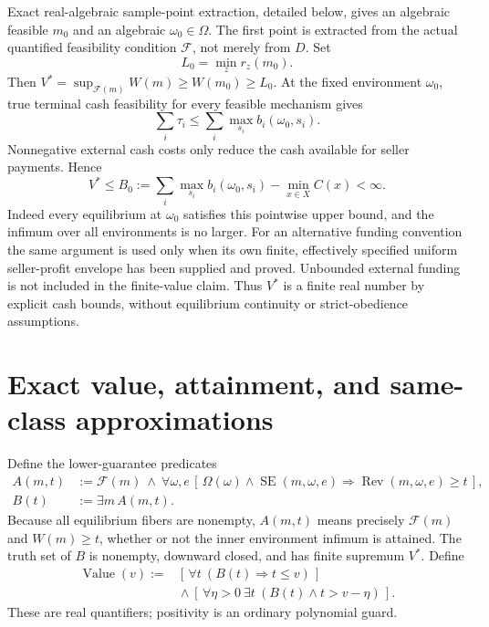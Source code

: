 \documentclass[11pt,a4paper]{article}
\numberwithin{equation}{section}
\theoremstyle{definition}
\DeclareMathOperator{\SE}{SE}
\DeclareMathOperator{\Val}{Value}
\DeclareMathOperator{\Rev}{Rev}
\begin{document}
Exact real-algebraic sample-point extraction, detailed below, gives
an algebraic feasible \(m_0\) and an algebraic \(\omega_0\in\Omega\).
The first point is extracted from the actual quantified feasibility
condition \(\mathcal F\), not merely from \(D\).
Set
\[
 L_0=\min_z r_z(m_0).
\]
Then \(V^*=\sup_{\mathcal F(m)}W(m)\ge W(m_0)\ge L_0\).
At the fixed environment \(\omega_0\), true terminal cash feasibility
for every feasible mechanism gives
\[
 \sum_i\tau_i\le\sum_i\max_{s_i}b_i(\omega_0,s_i).
\]
Nonnegative external cash costs only reduce the cash available for
seller payments. Hence
\begin{equation}\label{eq:valuebound}
 V^*\le B_0:=
    \sum_i\max_{s_i}b_i(\omega_0,s_i)-\min_{x\in X}C(x)<\infty.
\end{equation}
Indeed every equilibrium at \(\omega_0\) satisfies this pointwise
upper bound, and the infimum over all environments is no larger.
For an alternative funding convention the same argument is used only
when its own finite, effectively specified uniform seller-profit
envelope has been supplied and proved.
Unbounded external funding is not included in the finite-value claim.
Thus \(V^*\) is a finite real number by explicit cash bounds, without
equilibrium continuity or strict-obedience assumptions.

\section{Exact value, attainment, and same-class approximations}\label{sec:optimization}
Define the lower-guarantee predicates
\begin{align}
 A(m,t)&:=\mathcal F(m)\ \wedge\
  \forall\omega,e\,
   [\,\Omega(\omega)\wedge\SE(m,\omega,e)
           \Rightarrow\Rev(m,\omega,e)\ge t\,],\label{eq:guarantee}\\
 B(t)&:=\exists m\,A(m,t).\label{eq:threshold}
\end{align}
Because all equilibrium fibers are nonempty,
\(A(m,t)\) means precisely \(\mathcal F(m)\) and \(W(m)\ge t\),
whether or not the inner environment infimum is attained.
The truth set of \(B\) is nonempty, downward closed, and has finite
supremum \(V^*\).
Define
\begin{equation}\label{eq:Value}
 \begin{split}
 \Val(v):={}&
  [\,\forall t\ (B(t)\Rightarrow t\le v)\,]\\
 &{}\wedge
  [\,\forall\eta>0\ \exists t\ (B(t)\wedge t>v-\eta)\,].
 \end{split}
\end{equation}
These are real quantifiers; positivity is an ordinary polynomial guard.
\end{document}
